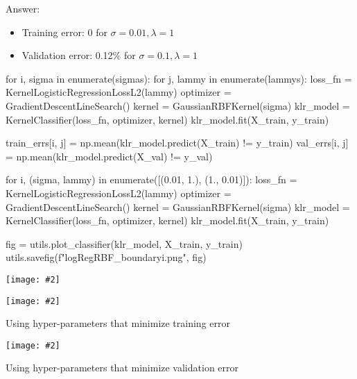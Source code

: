 \documentclass{article}
\newenvironment{answer}{\par\begingroup\color{gre}Answer: }{\endgroup}
\newcommand{\centerfig}[2]{\begin{center}\texttt{[image: \#2]}\end{center}}
\begin{document}
\begin{answer}
    \begin{itemize}
        \item Training error: 0 for $\sigma = 0.01, \lambda = 1$
        \item Validation error: 0.12\% for $\sigma = 0.1, \lambda = 1$
    \end{itemize}
\end{answer}

\vspace{5mm}
\begin{python}
for i, sigma in enumerate(sigmas):
    for j, lammy in enumerate(lammys):
        loss_fn = KernelLogisticRegressionLossL2(lammy)
        optimizer = GradientDescentLineSearch()
        kernel = GaussianRBFKernel(sigma)
        klr_model = KernelClassifier(loss_fn, optimizer, kernel)
        klr_model.fit(X_train, y_train)

        train_errs[i, j] = np.mean(klr_model.predict(X_train) != y_train)
        val_errs[i, j] = np.mean(klr_model.predict(X_val) != y_val)
\end{python}
\begin{python}
for i, (sigma, lammy) in enumerate([(0.01, 1.), (1., 0.01)]):
    loss_fn = KernelLogisticRegressionLossL2(lammy)
    optimizer = GradientDescentLineSearch()
    kernel = GaussianRBFKernel(sigma)
    klr_model = KernelClassifier(loss_fn, optimizer, kernel)
    klr_model.fit(X_train, y_train)

    fig = utils.plot_classifier(klr_model, X_train, y_train)
    utils.savefig(f"logRegRBF_boundary{i}.png", fig)
\end{python}

\centerfig{1}{figs/logRegRBF_grids}

\centerfig{0.5}{figs/logRegRBF_boundary0}
\begin{center}
    Using hyper-parameters that minimize training error
\end{center}
\vspace{8mm}
\centerfig{0.5}{figs/logRegRBF_boundary1}
\begin{center}
    Using hyper-parameters that minimize validation error
\end{center}
\end{document}
